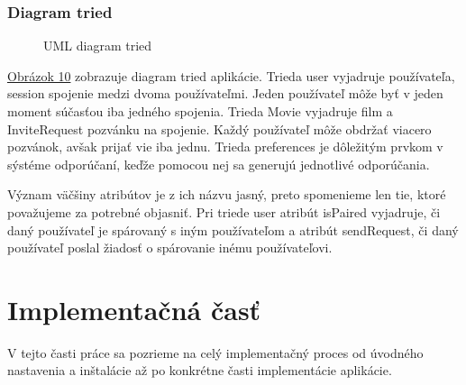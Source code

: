 \subsubsection{Diagram tried}
\begin{figure}[hbt!]
  \centering  
  \def\stackalignment{c}
           {\scriptsize}
	\caption{UML diagram tried}  
  \label{classdiagram}
\end{figure}
\hyperref[classdiagram]{Obrázok 10} zobrazuje diagram tried aplikácie. Trieda user vyjadruje používateľa, session spojenie medzi dvoma používateľmi. Jeden používateľ môže byť v jeden moment súčasťou iba jedného spojenia. Trieda Movie vyjadruje film a InviteRequest pozvánku na spojenie. Každý používateľ môže obdržať viacero pozvánok, avšak prijať vie iba jednu. Trieda preferences je dôležitým prvkom v sýstéme odporúčaní, keďže pomocou nej sa generujú jednotlivé odporúčania.

Význam väčšiny atribútov je z ich názvu jasný, preto spomenieme len tie, ktoré považujeme za potrebné objasniť. Pri triede user atribút isPaired vyjadruje, či daný používateľ je spárovaný s iným používateľom a atribút sendRequest, či daný používateľ poslal žiadosť o spárovanie inému používateľovi. 

\section{Implementačná časť}
V tejto časti práce sa pozrieme na celý implementačný proces od úvodného nastavenia a inštalácie až po konkrétne časti implementácie aplikácie.








